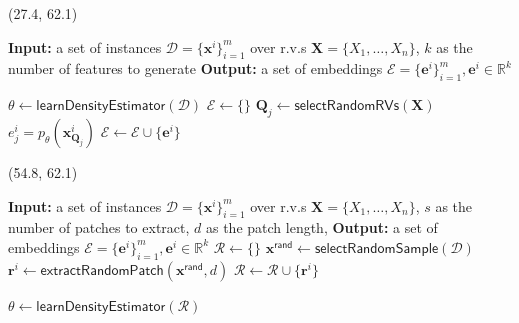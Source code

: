 \documentclass[final]{beamer}
\begin{document}
\begin{frame}{}
   \begin{textblock}{25.2}(27.4, 62.1)
        \footnotesize
      \begin{algorithmic}[1]
        \State \textbf{Input:} a set of instances
        $\mathcal{D}=\{\mathbf{x}^{i}\}_{i=1}^{m}$ over r.v.s
        $\mathbf{X}=\{X_1,\dots,X_n\}$, $k$ as the number of features to generate
        \State  \textbf{Output:}  a set of embeddings
        $\mathcal{E}=\{\mathbf{e}^{i}\}_{i=1}^{m}, \mathbf{e}^{i}\in\mathbb{R}^{k}$
        
        \State $\theta\leftarrow\mathsf{learnDensityEstimator}(\mathcal{D})$
        \State $\mathcal{E}\leftarrow\{\}$
        \State $\mathbf{Q}_{j}\leftarrow \mathsf{selectRandomRVs}(\mathbf{X})$
        \State $e^{i}_{j}= p_{\theta}(\mathbf{x}^{i}_{\mathbf{Q}_{j}})$  
        \EndFor
        \State $\mathcal{E}\leftarrow\mathcal{E}\cup\{\mathbf{e}^{i}\}$
        \EndFor
      \end{algorithmic}
  \end{textblock}
  
  \begin{textblock}{25.2}(54.8, 62.1)
    \footnotesize
      \begin{algorithmic}[1]
        \State \textbf{Input:} a set of instances
        $\mathcal{D}=\{\mathbf{x}^{i}\}_{i=1}^{m}$ over r.v.s
        $\mathbf{X}=\{X_1,\dots,X_n\}$,
        $s$ as the number of patches to extract,
        $d$ as the patch length,
        \State  \textbf{Output:}  a set of embeddings
        $\mathcal{E}=\{\mathbf{e}^{i}\}_{i=1}^{m}, \mathbf{e}^{i}\in\mathbb{R}^{k}$
        \State $\mathcal{R}\leftarrow\{\}$
        \State $\mathbf{x}^{\mathsf{rand}}\leftarrow
        \mathsf{selectRandomSample}(\mathcal{D})$
        \State $\mathbf{r}^{i}\leftarrow
        \mathsf{extractRandomPatch}(\mathbf{x}^{\mathsf{rand}}, d)$
        \State $\mathcal{R}\leftarrow\mathcal{R}\cup\{\mathbf{r}^{i}\}$
        \EndFor
        
        \State $\theta\leftarrow\mathsf{learnDensityEstimator}(\mathcal{R})$


\end{algorithmic}
\end{textblock}
\end{frame}
\end{document}
